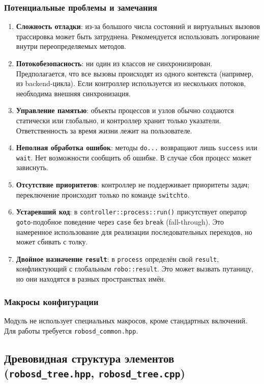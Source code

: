 \documentclass[a4paper,12pt]{article}
\begin{document}
\subsubsection{Потенциальные проблемы и замечания}

\begin{enumerate}
    \item \textbf{Сложность отладки}: из-за большого числа состояний и виртуальных вызовов трассировка может быть затруднена. Рекомендуется использовать логирование внутри переопределяемых методов.
    \item \textbf{Потокобезопасность}: ни один из классов не синхронизирован. Предполагается, что все вызовы происходят из одного контекста (например, из backend-цикла). Если контроллер используется из нескольких потоков, необходима внешняя синхронизация.
    \item \textbf{Управление памятью}: объекты процессов и узлов обычно создаются статически или глобально, и контроллер хранит только указатели. Ответственность за время жизни лежит на пользователе.
    \item \textbf{Неполная обработка ошибок}: методы \texttt{do...} возвращают лишь \texttt{success} или \texttt{wait}. Нет возможности сообщить об ошибке. В случае сбоя процесс может зависнуть.
    \item \textbf{Отсутствие приоритетов}: контроллер не поддерживает приоритеты задач; переключение происходит только по команде \texttt{switchto}.
    \item \textbf{Устаревший код}: в \texttt{controller::process::run()} присутствует оператор \texttt{goto}-подобное поведение через \texttt{case} без \texttt{break} (fall-through). Это намеренное использование для реализации последовательных переходов, но может сбивать с толку.
    \item \textbf{Двойное назначение \texttt{result}}: в \texttt{process} определён свой \texttt{result}, конфликтующий с глобальным \texttt{robo::result}. Это может вызвать путаницу, но они находятся в разных пространствах имён.
\end{enumerate}

\subsubsection{Макросы конфигурации}

Модуль не использует специальных макросов, кроме стандартных включений. Для работы требуется \texttt{robosd\_common.hpp}.

\subsection{Древовидная структура элементов (\texttt{robosd\_tree.hpp}, \texttt{robosd\_tree.cpp})}
\end{document}
